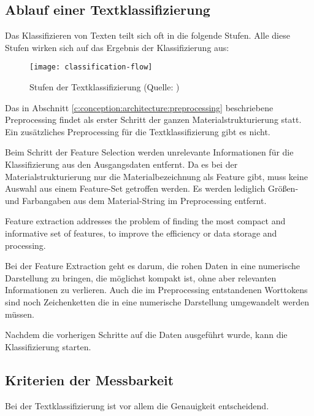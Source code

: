\subsection{Ablauf einer Textklassifizierung}
\label{c:conception:classification:steps}
Das Klassifizieren von Texten teilt sich oft in die folgende Stufen. Alle diese Stufen wirken sich auf das Ergebnis der Klassifizierung aus:

\begin{figure}[h]
	\centering
	\texttt{[image: classification-flow]}
	\caption[Textklassifizierung]{Stufen der Textklassifizierung (Quelle:  \cite{Foram_2016})}
	\label{fig:classification flow}
\end{figure}

Das in Abschnitt \ref{c:conception:architecture:preprocessing} beschriebene Preprocessing findet als erster Schritt der ganzen Materialstrukturierung statt. Ein zusätzliches Preprocessing für die Textklassifizierung gibt es nicht.

Beim Schritt der Feature Selection werden unrelevante Informationen für die Klassifizierung aus den Ausgangsdaten entfernt. Da es bei der Materialstrukturierung nur die Materialbezeichnung als Feature gibt, muss keine Auswahl aus einem Feature-Set getroffen werden. Es werden lediglich Größen- und Farbangaben aus dem Material-String im Preprocessing entfernt.

\begin{definition}
	\label{d:feature-extraction}
	\glqq Feature extraction addresses the problem of finding the most compact and informative set of features, to improve the efficiency or data storage and processing.\grqq{} \citep{Guyon2006}
\end{definition}
Bei der Feature Extraction geht es darum, die rohen Daten in eine numerische Darstellung zu bringen, die möglichst kompakt ist, ohne aber relevanten Informationen zu verlieren.
Auch die im Preprocessing entstandenen Worttokens sind noch Zeichenketten die in eine numerische Darstellung umgewandelt werden müssen.

Nachdem die vorherigen Schritte auf die Daten ausgeführt wurde, kann die Klassifizierung starten.

\subsection{Kriterien der Messbarkeit}
\label{c:conception:classification:criteria}
Bei der Textklassifizierung ist vor allem die Genauigkeit entscheidend.



